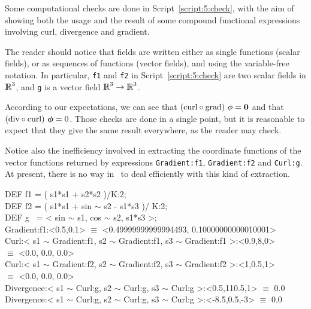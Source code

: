 \documentclass{31x47jw}
\begin{document}
\begin{example}
    
Some computational checks are done in Script~\ref{script:5:check},
with the aim of showing both the usage and the result of some compound
functional expressions involving curl, divergence and gradient. 

The reader should notice that fields are written either as single
functions (scalar fields), or as sequences of functions (vector
fields), and using the variable-free notation.  In particular,
\texttt{f1} and \texttt{f2} in Script~\ref{script:5:check} are two
scalar fields in $\mathbb{I\!\!R}^{3}$, and \texttt{g} is a vector field
$\mathbb{I\!\!R}^{3}\rightarrow\mathbb{I\!\!R}^{3}$.

According to our expectations, we can see that $ (\mbox{curl} \circ
\mbox{grad})\ \phi = {\mbox{\boldmath $0$}}$ and that $ (\mbox{div} \circ \mbox{curl})\
{\mbox{\boldmath $\phi$}} = 0$.  Those checks are done in a single
point, but it is reasonable to expect that they give the same result
everywhere, as the reader may check.

Notice also the inefficiency involved in extracting the coordinate
functions of the vector functions returned by expressions
\texttt{Gradient:f1}, \texttt{Gradient:f2} and \texttt{Curl:g}.  At
present, there is no way in \pl\ to deal efficiently with this
kind of extraction.

\begin{script}
\begin{smallplasm} 
DEF f1 = ( s1*s1 + s2*s2 )/K:2;\\
DEF f2 = ( s1*s1 + sin $\sim$ s2 - s1*s3 )/ K:2;\\
DEF g ~= < sin $\sim$ s1, cos $\sim$ s2, s1*s3 >;\\[0.3cm]

Gradient:f1:<0.5,0.1> $\equiv$ 
<0.49999999999994493, 0.10000000000010001>\\[0.3cm]

Curl:< s1 $\sim$ Gradient:f1, s2 $\sim$ Gradient:f1, s3 $\sim$ Gradient:f1 
>:<0.9,8,0>\+\\
$\equiv$ <0.0, 0.0, 0.0>\-\\
Curl:< s1 $\sim$ Gradient:f2, s2 $\sim$ Gradient:f2, s3 $\sim$ 
Gradient:f2 >:<1,0.5,1>\+\\
$\equiv$ <0.0, 0.0, 0.0>\-\\[0.3cm]

Divergence:< s1 $\sim$ Curl:g, s2 $\sim$ Curl:g, s3 $\sim$ Curl:g >:<0.5,110.5,1>
$\equiv$ 0.0\\
Divergence:< s1 $\sim$ Curl:g, s2 $\sim$ Curl:g, s3 $\sim$ Curl:g >:<-8.5,0.5,-3>
$\equiv$ 0.0
\end{smallplasm} 
\label{script:5:check}
\end{script}


\end{example}
\end{document}
